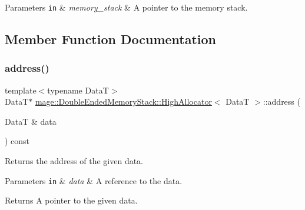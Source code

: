\begin{DoxyParams}[1]{Parameters}
\mbox{\tt in}  & {\em memory\+\_\+stack} & A pointer to the memory stack. \\
\hline
\end{DoxyParams}


\subsection{Member Function Documentation}
\hypertarget{structmage_1_1_double_ended_memory_stack_1_1_high_allocator_a5d2532bb8ebb4919271a312e3a872579}{}\label{structmage_1_1_double_ended_memory_stack_1_1_high_allocator_a5d2532bb8ebb4919271a312e3a872579} 
\subsubsection{\texorpdfstring{address()}{address()}\hspace{0.1cm}{\footnotesize\ttfamily [1/2]}}
{\footnotesize\ttfamily template$<$typename DataT$>$ \\
DataT$\ast$ \hyperlink{structmage_1_1_double_ended_memory_stack_1_1_high_allocator}{mage\+::\+Double\+Ended\+Memory\+Stack\+::\+High\+Allocator}$<$ DataT $>$\+::address (\begin{DoxyParamCaption}\item[{DataT \&}]{data }\end{DoxyParamCaption}) const\hspace{0.3cm}{\ttfamily [noexcept]}}

Returns the address of the given data.


\begin{DoxyParams}[1]{Parameters}
\mbox{\tt in}  & {\em data} & A reference to the data. \\
\hline
\end{DoxyParams}
\begin{DoxyReturn}{Returns}
A pointer to the given data. 
\end{DoxyReturn}
\hypertarget{structmage_1_1_double_ended_memory_stack_1_1_high_allocator_ab88c9b0e885ee1cc1aaaad2194ae7910}{}\label{structmage_1_1_double_ended_memory_stack_1_1_high_allocator_ab88c9b0e885ee1cc1aaaad2194ae7910} 
